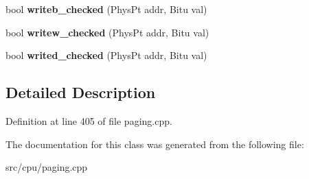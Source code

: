 \begin{DoxyCompactItemize}
\item 
\hypertarget{classExceptionPageHandler_adbf235a475734e4409d64221caeb42e0}{bool {\bfseries writeb\-\_\-checked} (Phys\-Pt addr, Bitu val)}\label{classExceptionPageHandler_adbf235a475734e4409d64221caeb42e0}

\item 
\hypertarget{classExceptionPageHandler_a13741eb7ada1e7c769e9395f827a5646}{bool {\bfseries writew\-\_\-checked} (Phys\-Pt addr, Bitu val)}\label{classExceptionPageHandler_a13741eb7ada1e7c769e9395f827a5646}

\item 
\hypertarget{classExceptionPageHandler_ae2f1819a31546b4bf7338faee9a645c4}{bool {\bfseries writed\-\_\-checked} (Phys\-Pt addr, Bitu val)}\label{classExceptionPageHandler_ae2f1819a31546b4bf7338faee9a645c4}

\end{DoxyCompactItemize}


\subsection{Detailed Description}


Definition at line 405 of file paging.\-cpp.



The documentation for this class was generated from the following file\-:\begin{DoxyCompactItemize}
\item 
src/cpu/paging.\-cpp\end{DoxyCompactItemize}
